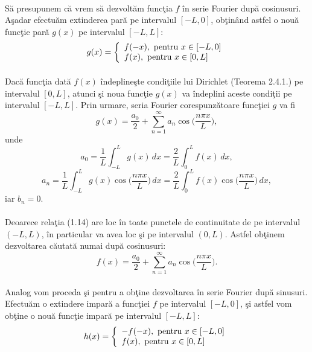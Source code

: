 \documentclass[a4paper,openany,12pt]{report}
\begin{document}
\paragraph*{}S\u a presupunem c\u a vrem s\u a dezvolt\u am func\c tia $f$ \^ in serie Fourier dup\u a cosinusuri. A\c sadar efectu\u am extinderea par\u a pe intervalul $[-L, 0]$, ob\c tin\^ and astfel o nou\u a func\c tie par\u a $g(x)$ pe intervalul $[-L, L]$:
\begin{equation*}
 g(x) = \left\{ \begin{array}{l l} f(-x), \text{ pentru $x$}\in [-L, 0]\\ f(x),\text{ pentru $x$}\in [0, L]\\ \end{array} \right.
\end{equation*}
\paragraph*{}Dac\u a func\c tia dat\u a $f(x)$ \^ indepline\c ste condi\c tiile lui Dirichlet (Teorema 2.4.1.) pe intervalul $[0, L]$, atunci \c si noua func\c tie $g(x)$ va \^ indeplini aceste condi\c tii pe intervalul $[-L, L]$. Prin urmare, seria Fourier corespunz\u atoare func\c tiei $g$ va fi
\begin{equation}
g(x)=\frac{a_0}{2} +\sum_{n=1}^{\infty}a_n\cos\Big(\frac{n\pi x}{L}\Big), 
\end{equation}
unde
\begin{equation*}
a_0=\frac{1}{L}\int_{-L}^Lg(x)\, dx=\frac{2}{L}\int_0^Lf(x)\, dx,
\end{equation*}
\begin{equation*}
a_n=\frac{1}{L}\int_{-L}^Lg(x)\cos\Big(\frac{n\pi x}{L}\Big)\, dx=\frac{2}{L}\int_0^Lf(x)\cos\Big(\frac{n\pi x}{L}\Big) \, dx,
\end{equation*}
iar $b_n=0$.
\paragraph*{}Deoarece rela\c tia (1.14) are loc \^ in toate punctele de continuitate de pe intervalul $(-L, L)$, \^ in particular va avea loc \c si pe intervalul $(0, L)$. Astfel ob\c tinem dezvoltarea c\u autat\u a numai dup\u a cosinusuri:
\begin{equation*}
f(x)=\frac{a_0}{2} +\sum_{n=1}^{\infty}a_n\cos\Big(\frac{n\pi x}{L}\Big).
\end{equation*}
\paragraph*{}Analog vom proceda \c si pentru a ob\c tine dezvoltarea \^ in serie Fourier dup\u a sinusuri. Efectu\u am o extindere impar\u a a func\c tiei $f$ pe intervalul $[-L, 0]$, \c si astfel vom ob\c tine o nou\u a func\c tie impar\u a pe intervalul $[-L, L]$:
\begin{equation*}
 h(x) = \left\{ \begin{array}{l l} -f(-x), \text{ pentru $x$}\in [-L, 0]\\ f(x),\text{ pentru $x$}\in [0, L]\\ \end{array} \right.
\end{equation*}
\end{document}
